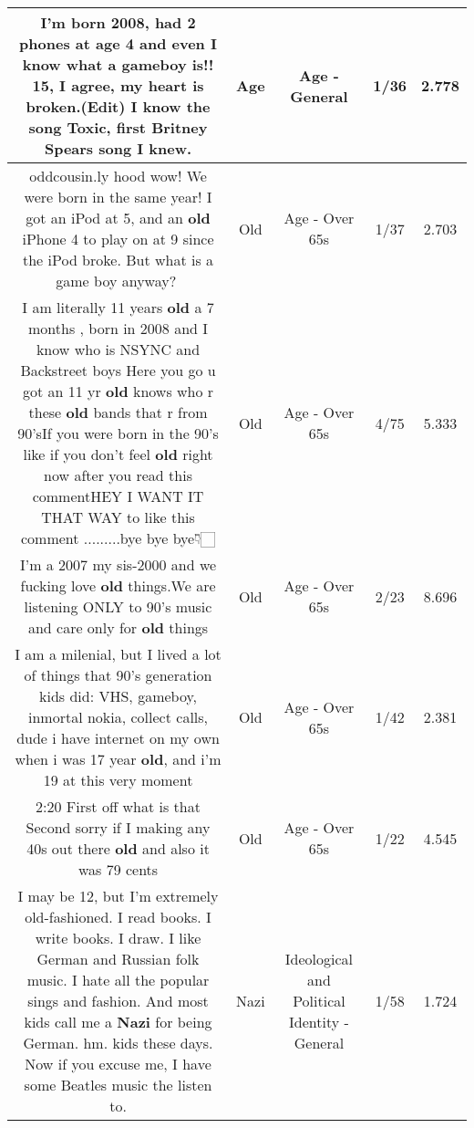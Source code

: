 \documentclass[11pt]{article}
\newlength\mylength
\begin{document}
\begin{center}
\begin{longtable}{|C{.65\mylength}|C{.30\mylength}|C{.12\mylength}|C{.12\mylength}|C{.12\mylength}|}
  \small I'm born 2008, had 2 phones at \textbf{age} 4 and even I know what a gameboy is!! 15, I agree, my heart is broken.(Edit) I know the song Toxic, first Britney Spears song I knew.\normalsize   & Age & Age - General & 1/36 & 2.778 \\  \hline
  \small oddcousin.ly  hood wow! We were born in the same year! I got an iPod at 5, and an \textbf{old} iPhone 4 to play on at 9 since the iPod broke. But what is a game boy anyway?🤔\normalsize   & Old & Age - Over 65s & 1/37 & 2.703 \\  \hline
  \small I am literally 11 years \textbf{old} a 7 months , born in 2008 and I know who is NSYNC and Backstreet boys Here you go u got an 11 yr \textbf{old}  knows who r these \textbf{old} bands  that r from 90'sIf you were born in the 90's like if you don't feel \textbf{old}  right now after you read this commentHEY I WANT IT THAT WAY to like this comment .........bye bye bye👇🏻\normalsize   & Old & Age - Over 65s & 4/75 & 5.333 \\  \hline
  \small I'm a 2007 my sis-2000 and we fucking love \textbf{old} things.We are listening ONLY to 90's music and care only for \textbf{old} things\normalsize   & Old & Age - Over 65s & 2/23 & 8.696 \\  \hline
  \small I am a milenial, but I lived a lot of things that 90's generation kids did: VHS, gameboy, inmortal nokia, collect calls, dude i have internet on my own when i was 17 year \textbf{old}, and i'm 19 at this very moment\normalsize   & Old & Age - Over 65s & 1/42 & 2.381 \\  \hline
  \small 2:20 First off what is that Second sorry if I making any 40s out there \textbf{old} and also it was 79 cents\normalsize   & Old & Age - Over 65s & 1/22 & 4.545 \\  \hline
  \small I may be 12, but I'm extremely old-fashioned. I read books. I write books. I draw. I like German and Russian folk music. I hate all the popular sings and fashion. And most kids call me a \textbf{Nazi} for being German. hm. kids these days. Now if you excuse me, I have some Beatles music the listen to.\normalsize   & Nazi &  Ideological and Political Identity - General & 1/58 & 1.724 \\  \hline

\end{longtable}
\end{center}
\end{document}
